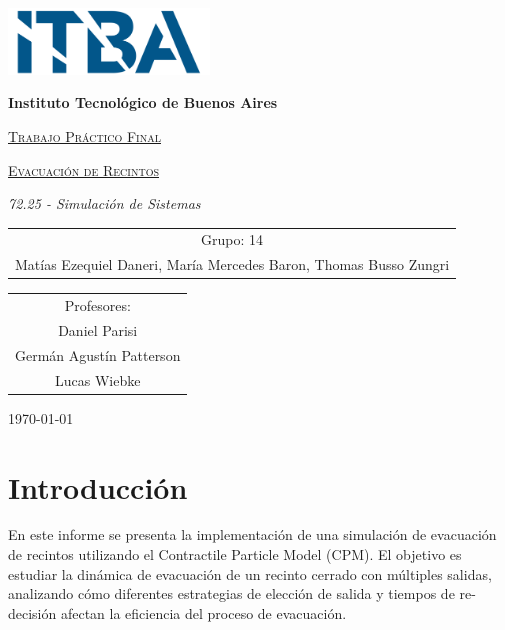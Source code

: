 \documentclass[12pt]{article}
\begin{document}
\begin{titlepage}
\begin{center}
{\includegraphics[width=0.4\textwidth]{img/Logo.png}\par}
\vspace{1cm}
{\bfseries\LARGE Instituto Tecnológico de Buenos Aires \par}
\vspace{0.5cm}
{\scshape\Huge\underline{Trabajo Práctico Final} \par}
{\scshape\Huge\underline{Evacuación de Recintos} \par}

\vspace{0.4cm}
{\Large\itshape 72.25 - Simulación de Sistemas \par}

\vfill

{\Large 
\begin{tabular}{c}
Grupo: 14\\[0.3cm]
Matías Ezequiel Daneri, María Mercedes Baron, Thomas Busso Zungri
\end{tabular}\par}

\vfill

{\Large 
\begin{tabular}{c}
Profesores: \\[0.3cm]
Daniel Parisi \\
Germán Agustín Patterson \\
Lucas Wiebke
\end{tabular}\par}

\vfill

{\Large \today \par}
\end{center}
\end{titlepage}

\tableofcontents
\setcounter{page}{0}
\newpage

\section{Introducción}
En este informe se presenta la implementación de una simulación de evacuación de recintos utilizando el Contractile Particle Model (CPM). El objetivo es estudiar la dinámica de evacuación de un recinto cerrado con múltiples salidas, analizando cómo diferentes estrategias de elección de salida y tiempos de re-decisión afectan la eficiencia del proceso de evacuación.
\end{document}
